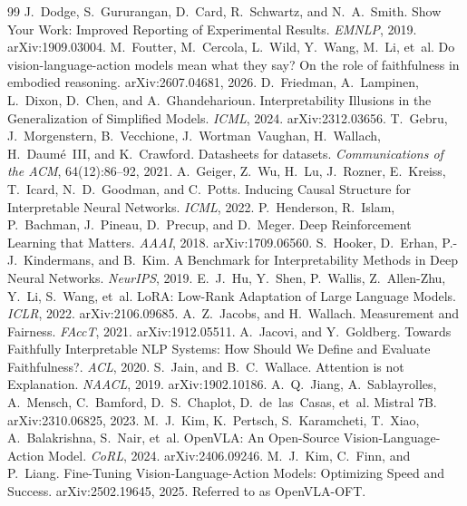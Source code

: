 \begin{thebibliography}{99}
 J.~Dodge, S.~Gururangan, D.~Card, R.~Schwartz, and N.~A.~Smith. Show Your Work: Improved Reporting of Experimental Results. \emph{EMNLP}, 2019. arXiv:1909.03004.
 M.~Foutter, M.~Cercola, L.~Wild, Y.~Wang, M.~Li, et~al. Do vision-language-action models mean what they say? On the role of faithfulness in embodied reasoning. arXiv:2607.04681, 2026.
 D.~Friedman, A.~Lampinen, L.~Dixon, D.~Chen, and A.~Ghandeharioun. Interpretability Illusions in the Generalization of Simplified Models. \emph{ICML}, 2024. arXiv:2312.03656.
 T.~Gebru, J.~Morgenstern, B.~Vecchione, J.~Wortman~Vaughan, H.~Wallach, H.~Daum\'e~III, and K.~Crawford. Datasheets for datasets. \emph{Communications of the ACM}, 64(12):86--92, 2021.
 A.~Geiger, Z.~Wu, H.~Lu, J.~Rozner, E.~Kreiss, T.~Icard, N.~D.~Goodman, and C.~Potts. Inducing Causal Structure for Interpretable Neural Networks. \emph{ICML}, 2022.
 P.~Henderson, R.~Islam, P.~Bachman, J.~Pineau, D.~Precup, and D.~Meger. Deep Reinforcement Learning that Matters. \emph{AAAI}, 2018. arXiv:1709.06560.
 S.~Hooker, D.~Erhan, P.-J.~Kindermans, and B.~Kim. A Benchmark for Interpretability Methods in Deep Neural Networks. \emph{NeurIPS}, 2019.
 E.~J.~Hu, Y.~Shen, P.~Wallis, Z.~Allen-Zhu, Y.~Li, S.~Wang, et~al. LoRA: Low-Rank Adaptation of Large Language Models. \emph{ICLR}, 2022. arXiv:2106.09685.
 A.~Z.~Jacobs, and H.~Wallach. Measurement and Fairness. \emph{FAccT}, 2021. arXiv:1912.05511.
 A.~Jacovi, and Y.~Goldberg. Towards Faithfully Interpretable NLP Systems: How Should We Define and Evaluate Faithfulness?. \emph{ACL}, 2020.
 S.~Jain, and B.~C.~Wallace. Attention is not Explanation. \emph{NAACL}, 2019. arXiv:1902.10186.
 A.~Q.~Jiang, A.~Sablayrolles, A.~Mensch, C.~Bamford, D.~S.~Chaplot, D.~de~las~Casas, et~al. Mistral 7B. arXiv:2310.06825, 2023.
 M.~J.~Kim, K.~Pertsch, S.~Karamcheti, T.~Xiao, A.~Balakrishna, S.~Nair, et~al. OpenVLA: An Open-Source Vision-Language-Action Model. \emph{CoRL}, 2024. arXiv:2406.09246.
 M.~J.~Kim, C.~Finn, and P.~Liang. Fine-Tuning Vision-Language-Action Models: Optimizing Speed and Success. arXiv:2502.19645, 2025. Referred to as OpenVLA-OFT.

\end{thebibliography}
